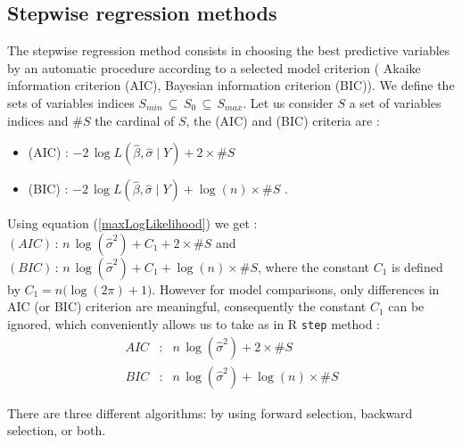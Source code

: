 %

\subsection{Stepwise regression methods}

The stepwise regression method consists in choosing the best predictive variables by an automatic procedure
 according to a selected model criterion ( Akaike information criterion (AIC), Bayesian information criterion (BIC)).
We define the sets of variables indices $ S_{min}\,\subseteq\, S_0\,\subseteq\, S_{max}$.
Let us consider $S$ a set of variables indices and $\# S$ the cardinal of $S$, the (AIC) and (BIC) criteria are :
\begin{itemize}
\item (AIC) : $-2\,\log L(\hat{\beta},\hat{\sigma}\mid Y) + 2 \times \# S $
\item (BIC) : $-2\,\log L(\hat{\beta},\hat{\sigma}\mid Y) + \log(n) \times \# S $ .
\end{itemize}

Using equation (\ref{maxLogLikelihood}) we get :
$(AIC) \,:\,  n\, \log(\hat{\sigma}^2) + C_1 + 2 \times \# S $ and $(BIC) \,:\,  n\, \log(\hat{\sigma}^2) + C_1 +\log(n) \times \# S $,  
where the constant $C_1$ is defined by $ C_1 = n \big(\log(2\pi)+1\big)$. However for model comparisons, only differences in AIC (or BIC) criterion are meaningful, consequently the constant $C_1$ can be ignored, 
which conveniently allows us to take as in R \texttt{step} method : 
 \begin{eqnarray}
 AIC &:&  n\, \log(\hat{\sigma}^2) + 2 \times \# S  \\
 BIC &:&  n\, \log(\hat{\sigma}^2) +\log(n) \times \# S   
\end{eqnarray}

There are three different algorithms: by using forward selection, backward selection, or both.

